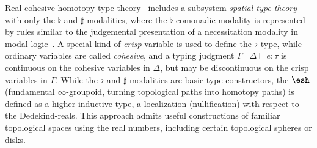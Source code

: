 \documentclass{article}
\begin{document}
  


Real-cohesive homotopy type theory~\citet{Shulman2015} includes a
subsystem \emph{spatial type theory} with only the $\flat$ and $\sharp$
modalities, where the $\flat$ comonadic modality is represented by rules
similar to the judgemental presentation of a necessitation modality in
modal logic~\citep{Pfenning2001}.  A special kind of \emph{crisp}
variable is used to define the $\flat$ type, while ordinary variables
are called \emph{cohesive}, and a typing judgment $\Gamma \mid \Delta
\vdash e : \tau$ is continuous on the cohesive variables in $\Delta$,
but may be discontinuous on the crisp variables in $\Gamma$.  While the
$\flat$ and $\sharp$ modalities are basic type constructors, the
$\shape$ (fundamental $\infty$-groupoid, turning topological paths into
homotopy paths) is defined as a higher inductive type, a localization
(nullification) with respect to the Dedekind-reals.  This approach
admits useful constructions of familiar topological spaces using the
real numbers, including certain topological spheres or disks.
\end{document}
